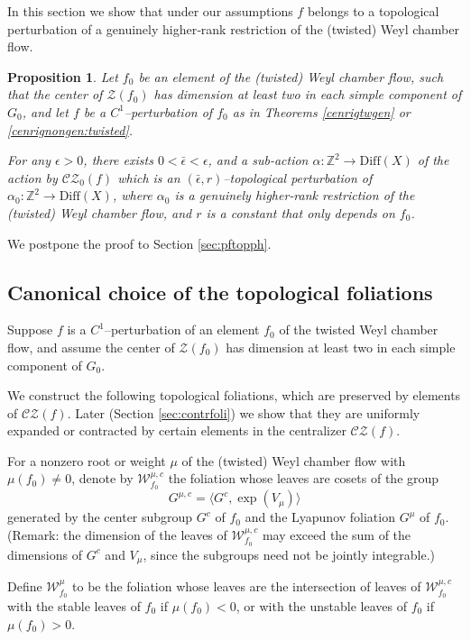 \documentclass[11pt]{amsart}
\numberwithin{equation}{section}
\newcommand{\Z}{\mathbb{Z}}
\newcommand{\CZ}{\mathcal{CZ}}
\theoremstyle{plain}
\newtheorem{prop}[thm]{Proposition}
\begin{document}
In this section we show that under our assumptions $f$ belongs to a
topological perturbation of a genuinely higher‑rank restriction of the
(twisted) Weyl chamber flow. 

\begin{prop}\label{topph}
 Let $f_0$ be an element of the (twisted) Weyl chamber flow, such that the center of $\mathcal Z(f_0)$ has dimension at least two in each simple component of $G_0$, and let $f$ be a $C^1$–perturbation of $f_0$ as in Theorems \ref{cenrigtwgen} or \ref{cenrignongen:twisted}. 

For any $\epsilon>0$, there exists $0<\bar\epsilon<\epsilon$, and a sub-action $\alpha:\Z^2\to\mathrm{Diff}(X)$ of the action by $\CZ_0(f)$ which is an $(\bar\epsilon,r)$–topological
perturbation of $\alpha_0:\Z^2\to\mathrm{Diff}(X)$, where $\alpha_0$ is a
genuinely higher‑rank restriction of the (twisted) Weyl chamber flow, and $r$ is a constant that only depends on $f_0$.
\end{prop}


We postpone the proof to Section \ref{sec:pftopph}.




 

\subsection{Canonical choice of the topological foliations}\label{cantopfol}
Suppose $f$ is a $C^1$–perturbation of an element $f_0$ of the twisted
Weyl chamber flow, and assume the center of $\mathcal Z(f_0)$ has dimension at least two in each simple component of $G_0$.

We construct the following topological foliations, which are preserved
by elements of $\CZ(f)$. Later (Section \ref{sec:contrfoli}) we show
that they are uniformly expanded or contracted by certain elements in
the centralizer $\CZ(f)$.

For a nonzero root or weight $\mu$ of the (twisted) Weyl chamber flow with
$\mu(f_0)\neq 0$, denote by $\mathcal W^{\mu,c}_{f_0}$ the foliation
whose leaves are cosets of the group
\[
G^{\mu,c}=\langle G^c,\exp(V_\mu)\rangle
\]
generated by the center subgroup $G^c$ of $f_0$ and the Lyapunov
foliation $G^\mu$ of $f_0$. (Remark: the dimension of the leaves of
$\mathcal W^{\mu,c}_{f_0}$ may exceed the sum of the dimensions of
$G^c$ and $V_\mu$, since the subgroups need not be jointly
integrable.)

Define $\mathcal W^\mu_{f_0}$ to be the foliation whose leaves are the
intersection of leaves of $\mathcal W^{\mu,c}_{f_0}$ with the stable
leaves of $f_0$ if $\mu(f_0)<0$, or with the unstable leaves of $f_0$ if
$\mu(f_0)>0$. 
\end{document}
